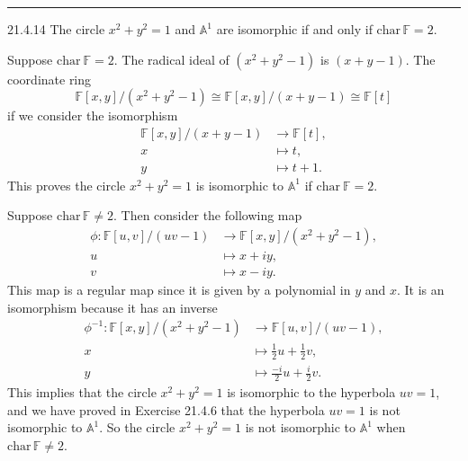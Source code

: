\documentclass[letterpaper, 12pt]{article}
\begin{document}
\noindent\rule{7in}{2.8pt}
\begin{problem}{21.4.14}
The circle \(x^2+y^2=1\) and \(\mathbb{A}^1\) are isomorphic if and only if \(\text{char}\, \mathbb{F}=2\).
\end{problem}
\begin{solution}
Suppose \(\text{char}\ \mathbb{F}=2\). The radical ideal of \((x^2+y^2-1)\) is \((x+y-1)\). The coordinate ring 
\[\mathbb{F}[x,y]/(x^2+y^2-1)\cong \mathbb{F}[x,y]/(x+y-1)\cong \mathbb{F}[t]\]
if we consider the isomorphism 
\begin{align*}
    \mathbb{F}[x,y]/(x+y-1)&\rightarrow \mathbb{F}[t],\\ 
    x&\mapsto t,\\ 
    y&\mapsto t+1.
\end{align*}
This proves the circle \(x^2+y^2=1\) is isomorphic to \(\mathbb{A}^1\) if \(\text{char}\ \mathbb{F}=2\). 

Suppose \(\text{char}\, \mathbb{F}\neq 2\). Then consider the following map 
\begin{align*}
    \phi:\mathbb{F}[u,v]/(uv-1)&\rightarrow \mathbb{F}[x,y]/(x^2+y^2-1),\\ 
    u&\mapsto x+iy,\\ 
    v&\mapsto x-iy. 
\end{align*}
This map is a regular map since it is given by a polynomial in \(y\) and \(x\). It is an isomorphism because it has an inverse 
\begin{align*}
    \phi^{-1}:\mathbb{F}[x,y]/(x^2+y^2-1)&\rightarrow \mathbb{F}[u,v]/(uv-1),\\ 
    x&\mapsto \frac{1}{2}u+\frac{1}{2}v,\\ 
    y&\mapsto \frac{-i}{2}u+\frac{i}{2}v.
\end{align*}
This implies that the circle \(x^2+y^2=1\) is isomorphic to the hyperbola \(uv=1\), and we have proved in Exercise 21.4.6 that the hyperbola \(uv=1\) is not isomorphic to \(\mathbb{A}^1\). So the circle \(x^2+y^2=1\) is not isomorphic to \(\mathbb{A}^1\) when \(\text{char}\, \mathbb{F}\neq 2\). 
\end{solution}
\end{document}

